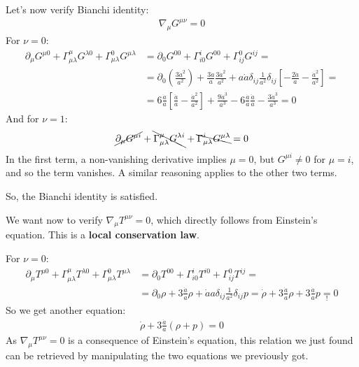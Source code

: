 \documentclass[../template.tex]{subfiles}
\begin{document}
Let's now verify Bianchi identity:
\begin{align*}
    \nabla_\mu G^{\mu \nu} = 0
\end{align*}
For $\nu = 0$:
\begin{align*}
    \partial_\mu G^{\mu 0} + \Gamma^\mu_{\mu \lambda} G^{\lambda 0} + \Gamma_{\mu \lambda}^0 G^{\mu \lambda} &= \partial_0 G^{00} + \Gamma^i_{i0} G^{00} + \Gamma_{ij}^0 G^{ij} =\\
    &= \partial_0 \left(\frac{3 \dot{a}^2}{a^2} \right) + \frac{3 \dot{a}}{a} \frac{3\dot{a}^2}{a^2} + a\dot{a} \delta_{ij}\frac{1}{a^2} \delta_{ij}\left[-\frac{2 \ddot{a}}{a} - \frac{\dot{a}^2}{a^2}   \right]  =\\
    &= 6 \frac{\dot{a}}{a} \left[\frac{\ddot{a}}{a} - \frac{\dot{a}^2}{a^2}  \right] + \frac{9\dot{a}^3}{a^3} - 6 \frac{\dot{a}}{a} \frac{\ddot{a}}{a} - \frac{3 \dot{a}^3}{a^3} = 0     
\end{align*} 
And for $\nu = 1$:
\begin{align*}
    \cancel{\partial_\mu G^{\mu i} }+\bcancel{ \Gamma^{\mu}_{\mu \lambda} G^{\lambda i}} + \bcancel{\Gamma^i_{\mu \lambda} G^{\mu \lambda} }= 0
\end{align*}
In the first term, a non-vanishing derivative implies $\mu = 0$, but $G^{\mu i} \neq 0$ for $\mu = i$, and so the term vanishes. A similar reasoning applies to the other two terms.  

So, the Bianchi identity is satisfied.

\medskip

We want now to verify $\nabla_\mu T^{\mu \nu} = 0$, which directly follows from Einstein's equation. This is a \textbf{local conservation law}. 

For $ \nu = 0$:
\begin{align*}
    \partial_\mu T^{\mu 0} + \Gamma_{\mu \lambda}^\mu T^{\lambda 0} + \Gamma_{\mu \lambda}^0 T^{\mu \lambda} &= \partial_0 T^{00} + \Gamma^i_{i0} T^{i0} + \Gamma_{ij}^0 T^{ij} =\\
    &= \partial_0 \rho + 3 \frac{\dot{a}}{a} \rho + \dot{a} a \delta_{ij} \frac{1}{a^2} \delta_{ij} p = \dot{\rho} + 3 \frac{\dot{a}}{a} \rho + 3 \frac{\dot{a}}{a} p  \underset{!}{=}  0    
\end{align*} 
So we get another equation:
\begin{align*}
    \dot{\rho} + 3 \frac{\dot{a}}{a} (\rho + p) = 0 
\end{align*}
As $\nabla_\mu T^{\mu \nu} = 0$ is a consequence of Einstein's equation, this relation we just found can be retrieved by manipulating the two equations we previously got.
\end{document}
